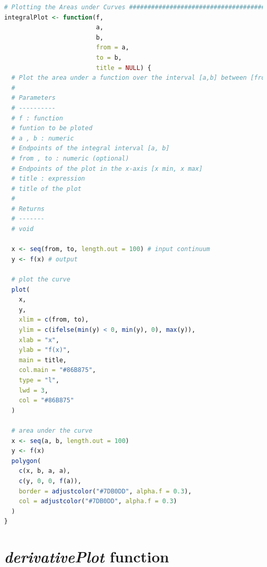 \documentclass[11pt,a4paper]{article}
\begin{document}
\begin{lstlisting}[frame=trBL, language=R]
# Plotting the Areas under Curves ######################################
integralPlot <- function(f,
                         a,
                         b,
                         from = a,
                         to = b,
                         title = NULL) {
  # Plot the area under a function over the interval [a,b] between [from,to].
  #
  # Parameters
  # ----------
  # f : function
  # funtion to be ploted
  # a , b : numeric
  # Endpoints of the integral interval [a, b]
  # from , to : numeric (optional)
  # Endpoints of the plot in the x-axis [x min, x max]
  # title : expression
  # title of the plot
  #
  # Returns
  # -------
  # void
  
  x <- seq(from, to, length.out = 100) # input continuum
  y <- f(x) # output
  
  # plot the curve
  plot(
    x,
    y,
    xlim = c(from, to),
    ylim = c(ifelse(min(y) < 0, min(y), 0), max(y)),
    xlab = "x",
    ylab = "f(x)",
    main = title,
    col.main = "#86B875",
    type = "l",
    lwd = 3,
    col = "#86B875"
  )
  
  # area under the curve
  x <- seq(a, b, length.out = 100)
  y <- f(x)
  polygon(
    c(x, b, a, a),
    c(y, 0, 0, f(a)),
    border = adjustcolor("#7DB0DD", alpha.f = 0.3),
    col = adjustcolor("#7DB0DD", alpha.f = 0.3)
  )
}
\end{lstlisting}

\clearpage

\section{\emph{derivativePlot} function}\label{sec:appendB}
\end{document}
